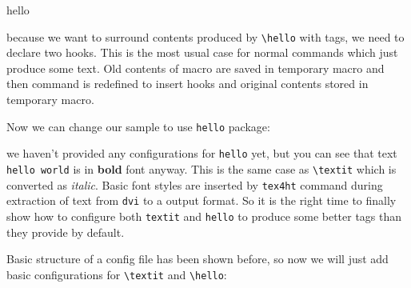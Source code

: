 \begin{texsource}
\let\tmp:hello\hello
\renewcommand\hello{\a:hello\tmp:hello\b:hello} 
\end{texsource}

because we want to surround contents produced by
\texttt{\textbackslash{}hello} with tags, we need to declare two hooks.
This is the most usual case for normal commands which just produce some
text. Old contents of macro are saved in temporary macro and then
command is redefined to insert hooks and original contents stored in
temporary macro.

Now we can change our sample to use \texttt{hello} package:


we haven't provided any configurations for \texttt{hello} yet, but you
can see that text \texttt{hello\ world} is in \textbf{bold} font anyway.
This is the same case as \texttt{\textbackslash{}textit} which is
converted as \emph{italic}. Basic font styles are inserted by
\texttt{tex4ht} command during extraction of text from \texttt{dvi} to a
output format. So it is the right time to finally show how to configure
both \texttt{textit} and \texttt{hello} to produce some better tags than
they provide by default.

Basic structure of a config file has been shown before, so now we will
just add basic configurations for \texttt{\textbackslash{}textit} and
\texttt{\textbackslash{}hello}:

\begin{texsource}

\EndPreamble
\end{texsource}

